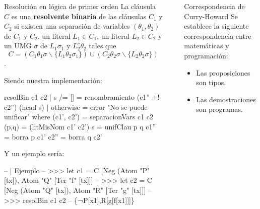 \documentclass[final]{beamer}
\newlength{\sepwid}
\newlength{\onecolwid}
\newlength{\twocolwid}
\begin{document}
\begin{frame}[t,fragile]
\begin{columns}[t]
\begin{column}{\onecolwid}
\begin{block}{Resolución en lógica de primer orden}
  La cláusula $C$ es una \textbf{resolvente binaria} de las cláusulas $C_1$ y
  $C_2$ si existen una separación de variables $(\theta_1,\theta_2)$ de $C_1$ y
  $C_2$, un literal $L_1\in C_1$, un literal $L_2\in C_2$ y un UMG $\sigma $ de
  $L_1\sigma_1$ y $L_2^c\theta_2$ tales que
  $$C=(C_1\theta_1\sigma \backslash \{L_1\theta_2\sigma_1\})\cup (C_2\theta_2\sigma \backslash \{L_2\theta_2\sigma \} ) $$.

  Siendo nuestra implementación:

  \begin{code}
resolBin c1 c2 | s /= [] =
          renombramiento (c1'' +! c2'') (head s)
               | otherwise =
          error "No se puede unificar"
    where
      (c1', c2') = separacionVars c1 c2
      (p,q) = (litMisNom c1' c2')
      s = unifClau p q
      c1'' = borra p c1'
      c2'' = borra q c2'
\end{code}


Y un ejemplo sería:

\begin{sesion}
-- | Ejemplo
-- >>> let c1 = C [Neg (Atom "P" [tx]), Atom "Q" [Ter "f" [tx]]]
-- >>> let c2 = C [Neg (Atom "Q" [tx]), Atom "R" [Ter "g" [tx]]]
-- >>> resolBin c1 c2
-- \{¬P[x1],R[g[f[x1]]]\}
\end{sesion}
\end{block}

\end{column} %

\begin{column}{\sepwid}\end{column} %

\begin{column}{\twocolwid} %

\begin{columns}[t,totalwidth=\twocolwid] %

\begin{column}{\onecolwid}\vspace{-.6in} %

  \begin{alertblock}{Correspondencia de Curry-Howard}
    Se establece la siguiente correspondencia entre matemáticas y programación:
    \begin{itemize}
    \item Las proposiciones son tipos.
    \item Las demostraciones son programas.
    \end{itemize}
  \end{alertblock}


\end{column}
\end{columns}
\end{column}
\end{columns}
\end{frame}
\end{document}
